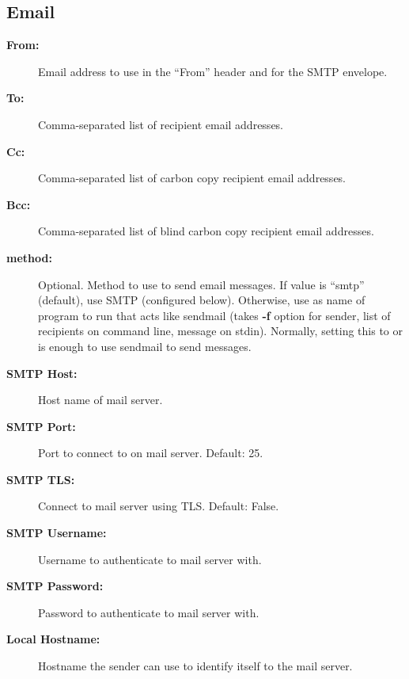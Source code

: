 \documentclass[letterpaper,10pt,english]{manual}
\begin{document}
\subsection{Email}
\begin{description}
\item[\textbf{From:}]
Email address to use in the ``From'' header and for the SMTP envelope.

\item[\textbf{To:}]
Comma-separated list of recipient email addresses.

\item[\textbf{Cc:}]
Comma-separated list of carbon copy recipient email
addresses.

\item[\textbf{Bcc:}]
Comma-separated list of blind carbon copy recipient
email addresses.

\item[\textbf{method:}]
Optional. Method to use to send email messages. If value is ``smtp'' (default),
use SMTP (configured below).  Otherwise, use as name of program to run that
acts like sendmail (takes \textbf{-f} option for sender, list of recipients on
command line, message on stdin). Normally, setting this to  or
 is enough to use sendmail to send messages.

\item[\textbf{SMTP Host:}]
Host name of mail server.

\item[\textbf{SMTP Port:}]
Port to connect to on mail server.
Default: 25.

\item[\textbf{SMTP TLS:}]
Connect to mail server using TLS.
Default: False.

\item[\textbf{SMTP Username:}]
Username to authenticate to mail server with.

\item[\textbf{SMTP Password:}]
Password to authenticate to mail server with.

\item[\textbf{Local Hostname:}]
Hostname the sender can use to identify itself to the mail server.

\end{description}
\hypertarget{module-diff.settings}{}
\end{document}
